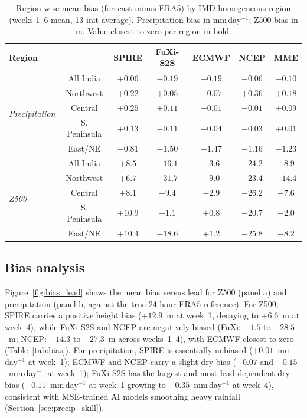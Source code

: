 \documentclass[11pt,a4paper]{article}
\begin{document}
\begin{table}[t]\centering
\small
\setlength{\tabcolsep}{5pt}
\caption{Region-wise mean bias (forecast minus ERA5) by IMD homogeneous
region (weeks 1--6 mean, 13-init average). Precipitation bias in
mm\,day$^{-1}$; Z500 bias in m. Value closest to zero per region in
bold.}\label{tab:reg_bias}
\begin{tabular}{lcccccc}\toprule
Region & & SPIRE & FuXi-S2S & ECMWF & NCEP & MME \\
\midrule
\multirow{5}{*}{\emph{Precipitation}} &
All India    & $\mathbf{+0.06}$ & $-0.19$ & $-0.19$ & $-0.06$ & $-0.10$ \\
& Northwest    & $+0.22$ & $+0.05$ & $\mathbf{+0.07}$ & $+0.36$ & $+0.18$ \\
& Central      & $+0.25$ & $+0.11$ & $\mathbf{-0.01}$ & $\mathbf{-0.01}$ & $+0.09$ \\
& S. Peninsula & $+0.13$ & $-0.11$ & $\mathbf{+0.04}$ & $-0.03$ & $+0.01$ \\
& East/NE      & $\mathbf{-0.81}$ & $-1.50$ & $-1.47$ & $-1.16$ & $-1.23$ \\
\midrule
\multirow{5}{*}{\emph{Z500}} &
All India    & $+8.5$  & $-16.1$ & $\mathbf{-3.6}$  & $-24.2$ & $-8.9$ \\
& Northwest    & $+6.7$  & $-31.7$ & $\mathbf{-9.0}$  & $-23.4$ & $-14.4$ \\
& Central      & $+8.1$  & $-9.4$  & $\mathbf{-2.9}$  & $-26.2$ & $-7.6$ \\
& S. Peninsula & $+10.9$ & $+1.1$ & $\mathbf{+0.8}$  & $-20.7$ & $-2.0$ \\
& East/NE      & $+10.4$ & $-18.6$ & $\mathbf{+1.2}$  & $-25.8$ & $-8.2$ \\
\bottomrule
\end{tabular}\end{table}

\subsection{Bias analysis}\label{sec:bias}

Figure~\ref{fig:bias_lead} shows the mean bias versus lead for Z500
(panel a) and precipitation (panel b, against the true 24-hour ERA5
reference). For Z500, SPIRE carries a positive height bias
($+12.9$~m at week~1, decaying to $+6.6$~m at week~4), while FuXi-S2S
and NCEP are negatively biased (FuXi: $-1.5$ to $-28.5$~m; NCEP:
$-14.3$ to $-27.3$~m across weeks~1--4), with ECMWF closest to zero
(Table~\ref{tab:bias}). For precipitation, SPIRE is essentially unbiased
($+0.01$~mm\,day$^{-1}$ at week~1); ECMWF and NCEP carry a slight dry
bias ($-0.07$ and $-0.15$~mm\,day$^{-1}$ at week~1); FuXi-S2S has the
largest and most lead-dependent dry bias ($-0.11$~mm\,day$^{-1}$ at
week~1 growing to $-0.35$~mm\,day$^{-1}$ at week~4), consistent with
MSE-trained AI models smoothing heavy rainfall
(Section~\ref{sec:precip_skill}).
\end{document}
